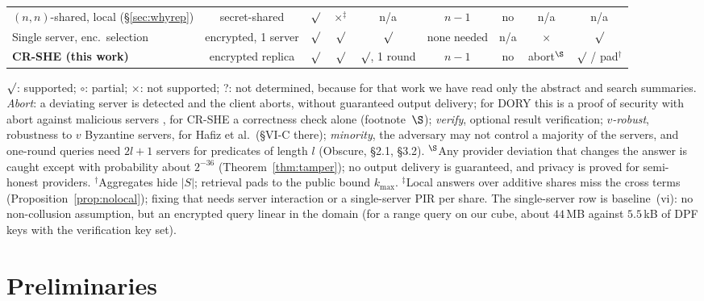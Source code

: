 \documentclass[a4paper,fleqn]{cas-sc}
\providecommand{\checkmark}{\ensuremath{\surd}}
\begin{document}
\begin{table}[pos=t,width=\textwidth]
\begin{tabular*}{\tblwidth}{@{\extracolsep{\fill}}lcccccccc@{}}
\midrule
$(n,n)$-shared, local (\S\ref{sec:whyrep}) & secret-shared & $\checkmark$ &
$\times^{\ddagger}$ & n/a & $n-1$ & no & n/a & n/a \\
Single server, enc.\ selection & encrypted, 1 server & $\checkmark$ &
$\checkmark$ & $\checkmark$ & none needed & n/a & $\times$ & $\checkmark$ \\
\textbf{CR-SHE (this work)} & encrypted replica & $\checkmark$ & $\checkmark$ &
$\checkmark$, 1 round & $n-1$ & no & abort$^{\S}$ & $\checkmark$ / pad$^{\dagger}$ \\
\bottomrule
\end{tabular*}
\vspace{3pt}
\begin{flushleft}
\footnotesize
$\checkmark$: supported; $\circ$: partial; $\times$: not supported; ?: not
determined, because for that work we have read only the abstract and search
summaries. \emph{Abort}: a deviating server is detected and the client aborts,
without guaranteed output delivery; for DORY this is a proof of security with
abort against malicious servers \citep{dory}, for CR-SHE a correctness check
alone (footnote~$\S$); \emph{verify}, optional result verification;
\emph{$v$-robust}, robustness to $v$ Byzantine servers, for
Hafiz et al.\ (\S VI-C there); \emph{minority}, the adversary may not
control a majority of the servers, and one-round queries need $2l+1$ servers
for predicates of length $l$ (Obscure, \S2.1, \S3.2). $^{\S}$Any provider deviation that changes the answer is caught
except with probability about $2^{-36}$ (Theorem~\ref{thm:tamper}); no output
delivery is guaranteed, and privacy is proved for semi-honest providers. $^{\dagger}$Aggregates hide $|S|$; retrieval pads to the
public bound $k_{\max}$. $^{\ddagger}$Local answers over additive shares miss
the cross terms (Proposition~\ref{prop:nolocal}); fixing that needs server
interaction or a single-server PIR per share. The single-server row is
baseline~(vi): no non-collusion assumption, but an encrypted query linear in
the domain (for a range query on our cube, about $44$\,MB against $5.5$\,kB of
DPF keys with the verification key set).
\end{flushleft}
\end{table}

\section{Preliminaries}
\label{sec:prelim}
\end{document}
